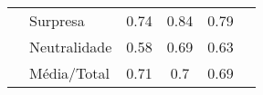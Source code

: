\begin{table}[]
\begin{tabular}{llcccc}
                                        & Surpresa              & 0.74                                  & 0.84                                   & 0.79                                  &                                       \\
                                        & Neutralidade          & 0.58                                  & 0.69                                   & 0.63                                  &                                       \\
                                        & Média/Total           & 0.71                                  & 0.7                                    & 0.69                                  &                                       \\ \hline
\end{tabular}
\end{table}



